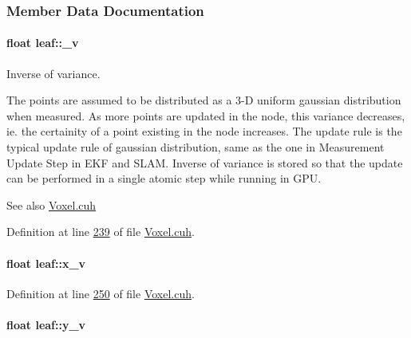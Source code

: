 \subsubsection{Member Data Documentation}
\paragraph[{\texorpdfstring{\+\_\+v}{_v}}]{\setlength{\rightskip}{0pt plus 5cm}float leaf\+::\+\_\+v}\hypertarget{classleaf_a4fc347dbd4f5911bbb477910588ed512}{}\label{classleaf_a4fc347dbd4f5911bbb477910588ed512}


Inverse of variance. 

The points are assumed to be distributed as a 3-\/D uniform gaussian distribution when measured. As more points are updated in the node, this variance decreases, ie. the certainity of a point existing in the node increases. The update rule is the typical update rule of gaussian distribution, same as the one in Measurement Update Step in E\+KF and S\+L\+AM. Inverse of variance is stored so that the update can be performed in a single atomic step while running in G\+PU. \begin{DoxySeeAlso}{See also}
\hyperlink{Voxel_8cuh}{Voxel.\+cuh} 
\end{DoxySeeAlso}


Definition at line \hyperlink{Voxel_8cuh_source_l00239}{239} of file \hyperlink{Voxel_8cuh_source}{Voxel.\+cuh}.

\paragraph[{\texorpdfstring{x\+\_\+v}{x_v}}]{\setlength{\rightskip}{0pt plus 5cm}float leaf\+::x\+\_\+v}\hypertarget{classleaf_ac34a93ca5739928d7389b12e735252d4}{}\label{classleaf_ac34a93ca5739928d7389b12e735252d4}


Definition at line \hyperlink{Voxel_8cuh_source_l00250}{250} of file \hyperlink{Voxel_8cuh_source}{Voxel.\+cuh}.

\paragraph[{\texorpdfstring{y\+\_\+v}{y_v}}]{\setlength{\rightskip}{0pt plus 5cm}float leaf\+::y\+\_\+v}\hypertarget{classleaf_a06a94d40da44b846913db4d8900b2626}{}\label{classleaf_a06a94d40da44b846913db4d8900b2626}


